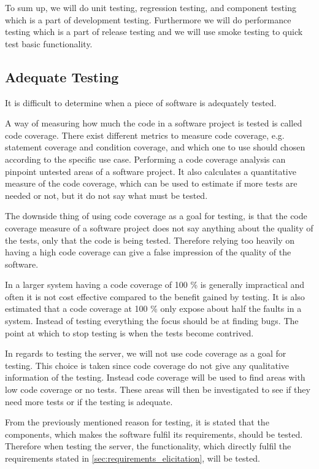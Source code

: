 To sum up, we will do unit testing, regression testing, and component testing which is a part of development testing. 
Furthermore we will do performance testing which is a part of release testing
and we will use smoke testing to quick test basic functionality.

\subsection{Adequate Testing}\label{subsec:adequate_testing}
It is difficult to determine when a piece of software is adequately tested.

A way of measuring how much the code in a software project is tested is called code coverage.
There exist different metrics to measure code coverage, e.g. statement coverage and condition coverage,
and which one to use should chosen according to the specific use case.
Performing a code coverage analysis can pinpoint untested areas of a software project.
It also calculates a quantitative measure of the code coverage, 
which can be used to estimate if more tests are needed or not, 
but it do not say what must be tested.\cite{code_coverage}

The downside thing of using code coverage as a goal for testing, 
is that the code coverage measure of a software project does not say anything about the quality of the tests, 
only that the code is being tested.
Therefore relying too heavily on having a high code coverage can give a false impression of the quality of the software.\cite{code_coverage_neg}

In a larger system having a code coverage of 100 \% is generally impractical and often it is not cost effective compared to the benefit gained by testing.
It is also estimated that a code coverage at 100 \% only expose about half the faults in a system.
Instead of testing everything the focus should be at finding bugs.
The point at which to stop testing is when the tests become contrived.\cite{code_coverage_not_100}

\bigskip

In regards to testing the server, we will not use code coverage as a goal for testing.
This choice is taken since code coverage do not give any qualitative information of the testing.
Instead code coverage will be used to find areas with low code coverage or no tests.
These areas will then be investigated to see if they need more tests or if the testing is adequate.

From the previously mentioned reason for testing, 
it is stated that the components, which makes the software fulfil its requirements, should be tested.
Therefore when testing the server, the functionality, 
which directly fulfil the requirements stated in \cref{sec:requirements_elicitation}, will be tested.

